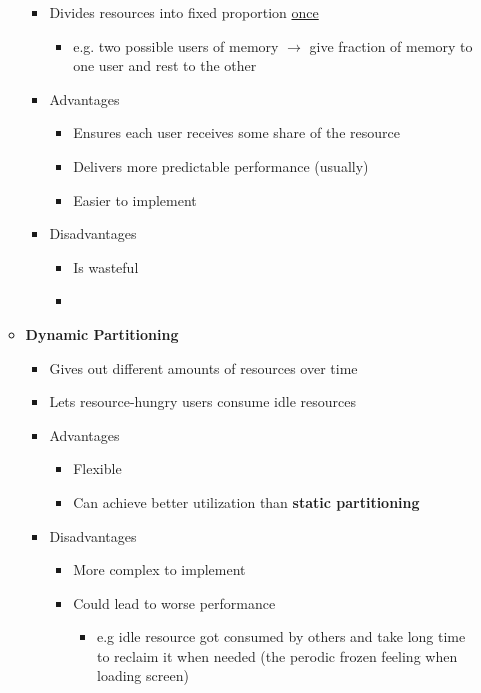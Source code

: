 \documentclass[12pt]{article}
\begin{document}
\begin{enumerate}[1.]
\begin{itemize}
        \begin{itemize}
            \item Divides resources into fixed proportion \underline{once}
            \begin{itemize}
                \item e.g. two possible users of memory $\to$ give fraction of memory to one user and
                rest to the other
            \end{itemize}
            \item Advantages
            \begin{itemize}
                \item Ensures each user receives some share of the resource
                \item Delivers more predictable performance (usually)
                \item Easier to implement
            \end{itemize}
            \item Disadvantages
            \begin{itemize}
                \item Is wasteful
                \item
            \end{itemize}
        \end{itemize}

        \item \textbf{Dynamic Partitioning}

        \begin{itemize}
            \item Gives out different amounts of resources over time
            \item Lets resource-hungry users consume idle resources
            \item Advantages
            \begin{itemize}
                \item Flexible
                \item Can achieve better utilization than \textbf{static partitioning}
            \end{itemize}
            \item Disadvantages
            \begin{itemize}
                \item More complex to implement
                \item Could lead to worse performance
                \begin{itemize}
                    \item e.g idle resource got consumed by others and take long
                    time to reclaim it when needed (the perodic frozen feeling when loading screen)
                \end{itemize}
            \end{itemize}
        \end{itemize}


\end{itemize}
\end{enumerate}
\end{document}
